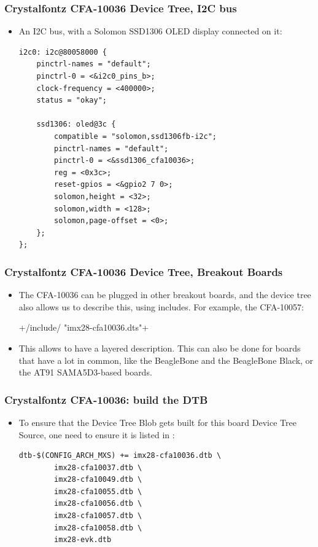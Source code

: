 \begin{frame}[fragile]
  \frametitle{Crystalfontz CFA-10036 Device Tree, I2C bus}
  \begin{itemize}
  \item An I2C bus, with a Solomon SSD1306 OLED display connected on
    it:
    \begin{block}{}
      \begin{verbatim}
i2c0: i2c@80058000 {
    pinctrl-names = "default";
    pinctrl-0 = <&i2c0_pins_b>;
    clock-frequency = <400000>;
    status = "okay";

    ssd1306: oled@3c {
        compatible = "solomon,ssd1306fb-i2c";
        pinctrl-names = "default";
        pinctrl-0 = <&ssd1306_cfa10036>;
        reg = <0x3c>;
        reset-gpios = <&gpio2 7 0>;
        solomon,height = <32>;
        solomon,width = <128>;
        solomon,page-offset = <0>;
    };
};
      \end{verbatim}
    \end{block}
  \end{itemize}
\end{frame}

\begin{frame}[fragile]
  \frametitle{Crystalfontz CFA-10036 Device Tree, Breakout Boards}
  \begin{itemize}
  \item The CFA-10036 can be plugged in other breakout boards, and the
    device tree also allows us to describe this, using includes. For
    example, the CFA-10057:
    \begin{block}{}
      +/include/ "imx28-cfa10036.dts"+
    \end{block}
  \item This allows to have a layered description. This can also be
    done for boards that have a lot in common, like the BeagleBone and
    the BeagleBone Black, or the AT91 SAMA5D3-based boards.
  \end{itemize}
\end{frame}

\begin{frame}[fragile]
  \frametitle{Crystalfontz CFA-10036: build the DTB}
  \begin{itemize}
  \item To ensure that the Device Tree Blob gets built for this board
    Device Tree Source, one need to ensure it is listed in
    :
    \begin{block}{}
      \begin{verbatim}
dtb-$(CONFIG_ARCH_MXS) += imx28-cfa10036.dtb \
        imx28-cfa10037.dtb \
        imx28-cfa10049.dtb \
        imx28-cfa10055.dtb \
        imx28-cfa10056.dtb \
        imx28-cfa10057.dtb \
        imx28-cfa10058.dtb \
        imx28-evk.dtb
      \end{verbatim}
    \end{block}
  \end{itemize}
\end{frame}

